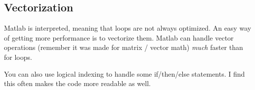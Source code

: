 \pagebreak
\subsection{Vectorization}
Matlab is interpreted, meaning that loops are not always optimized.
 An easy way of getting more performance is to vectorize them.
 Matlab can handle vector operations (remember it was made for matrix / vector math) \emph{much} faster than for loops.

You can also use logical indexing to handle some if/then/else statements.
 I find this often makes the code more readable as well.
 
\begin{quote}

\end{quote}
